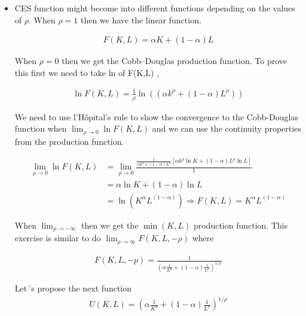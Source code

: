\begin{itemize}
\item 
CES function might become into different functions depending on the values of $\rho$.
When $\rho = 1$ then we have the linear function. 

    \begin{equation}
    \begin{aligned}
    F(K,L) = \alpha K + (1-\alpha)L
    \end{aligned}
    \end{equation}

When $\rho = 0$ then we get the Cobb–Douglas production function. To prove this first we need to take ln of F(K,L) ,

    \begin{equation}
    \begin{aligned}
    \ln{F(K,L)} = \frac{1}{\rho} \ln((\alpha k^{\rho} + (1-\alpha)L^{\rho}))
    \end{aligned}
    \end{equation}

We need to use l'Hôpital's rule to show the convergence to the Cobb-Douglas function when $\lim_{\rho\to 0}\ln{F(K,L)}$ and we can use the continuity properties from the production function. 

    \begin{equation}
    \begin{aligned}
        \lim_{\rho\to 0}\ln{F(K,L)} 
        & = \lim_{\rho\to 0} \frac{\frac{1}{\alpha k^{\rho} + (1-\alpha)L^{\rho}}
        [\alpha k^{\rho}\ln{K} + (1-\alpha)L^{\rho}\ln{L}]}{1} \\
        & = \alpha \ln{K} + (1-\alpha) \ln{L} \\
        &  =  \ln(K^{\alpha}L^{(1-\alpha)}) \Longrightarrow {F(K,L)} = K^{\alpha}L^{(1-\alpha)}
    \end{aligned}
    \end{equation}

When $\lim_{\rho \to -\infty}$ then we get the $\min{(K, L)}$ production function.
This exercise is similar to do $\lim_{\rho \to \infty}F(K,L,-\rho)$ where 

    \begin{equation}
    \begin{aligned}
    F(K,L,-p) = \frac{1}{(\alpha \frac{1}{K^{\rho}} + (1-\alpha)\frac{1}{L^{\rho}})^{1/\rho}}
    \end{aligned}
    \end{equation}

Let´s propose the next function 
    \begin{equation}
    \begin{aligned}
    U(K,L) = (\alpha \frac{1}{K^{\rho}} + (1-\alpha)\frac{1}{L^{\rho}})^{1/\rho}
    \end{aligned}
    \end{equation}


\end{itemize}
